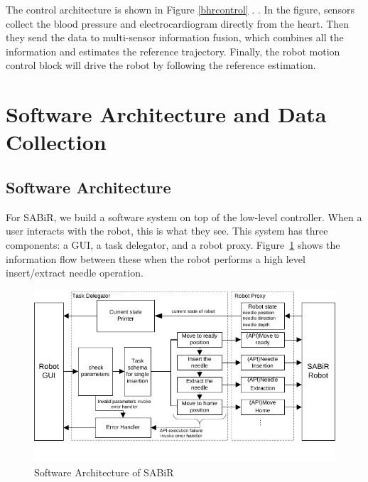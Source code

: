 The control architecture is shown in Figure \ref{bhrcontrol} \cite{Bebek2007, Tuna2013}. . In the figure, sensors collect the blood pressure and electrocardiogram directly from the heart. Then they send the data to multi-sensor information fusion, which combines all the information and estimates the reference trajectory. Finally, the robot motion control block will drive the robot by following the reference estimation.

\section{Software Architecture and Data Collection}\label{softwareframe}

\subsection{Software Architecture}
For SABiR, we build a software system on top of the low-level controller. When a user interacts with the robot, this is what they see.  This system has three components: a GUI, a task delegator, and a robot proxy. Figure~\ref{sabirsw} shows the information flow between these when the robot performs a high level insert/extract needle operation.

\begin{figure}[!thpb]
\centering
\includegraphics[width=\textwidth]{chapter5_SABiRsw.pdf}
\caption{Software Architecture of SABiR}
\label{sabirsw}
\end{figure}

